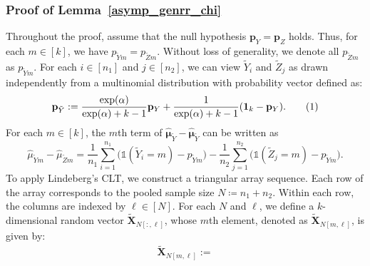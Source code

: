\documentclass[twoside,11pt]{article}
\newcommand\numberthis{\addtocounter{equation}{1}\tag{\theequation}}
\newcommand{\rvTwo}{Y}
\newcommand{\rvThree}{Z}
\newcommand{\vectorize}[1]{\mathbf{#1}}
\newcommand{\rvX}{X} %
\newcommand{\rVecX}{\vectorize{\rvX}}
\newcommand{\rvY}{Y}
\newcommand{\rvZ}{Z}
\newcommand{\sampleIndexOne}{i}
\newcommand{\sampleIndexTwo}{j}
\newcommand{\alphabetSize}{k} %
\newcommand{\vectorIndex}{m}
\newcommand{\sampleSize}{n}
\newcommand{\probVecElement}[2]{p_{{#1}{#2}}}
\newcommand{\probVec}{\mathbf{p}} %
\begin{document}
\begin{appendix}
	\subsubsection{Proof of Lemma~\ref{asymp_genrr_chi}}\label{proof:asymp_genrr_chi}
	Throughout the proof, assume that the null hypothesis $\probVec_{\rvTwo} = \probVec_{\rvZ}$ holds. Thus, for each $\vectorIndex \in [\alphabetSize]$, we have $\probVecElement{\tilde{\rvTwo}}{\vectorIndex} = \probVecElement{\tilde{\rvThree}}{\vectorIndex}$. Without loss of generality, we  denote all $\probVecElement{\tilde{\rvThree}}{\vectorIndex}$ as $\probVecElement{\tilde{\rvTwo}}{\vectorIndex}$.
	For each
	$\sampleIndexOne \in [\sampleSize_1]$
	and
	$\sampleIndexTwo \in [\sampleSize_2]$,
	we can  view $\tilde{\rvY}_{\sampleIndexOne}$ and $\tilde{\rvZ}_{\sampleIndexTwo}$ as  drawn independently from a multinomial distribution with probability vector defined as:
	\begin{align*}
		\probVec_{\tilde{\rvTwo}}
		:=
		\frac
		{\exp(\alpha)}
		{\exp(\alpha) + \alphabetSize - 1 }\probVec_{\rvTwo}
		+
		\frac
		{1}
		{\exp(\alpha) + \alphabetSize - 1 }(\mathbf{1}_\alphabetSize-\probVec_{\rvTwo})	.
		\numberthis \label{genrr_transformed_p}
	\end{align*}
	For each $m \in [\alphabetSize]$, the $\vectorIndex$th term of $
	\hat{\boldsymbol{\mu}}_{\tilde{\rvY}}
	-
	\hat{\boldsymbol{\mu}}_{\tilde{\rvY}}
	$ can be written as
	\begin{equation*}
		\hat{{\mu}}_{ \tilde{\rvY} \vectorIndex}
		-
		\hat{{\mu}}_{ \tilde{\rvZ} \vectorIndex}
		=
		\frac{1}{\sampleSize_1}
		\sum_{\sampleIndexOne=1}^{\sampleSize_1}
		\bigl(
		\mathds{1}(\tilde{\rvTwo}_\sampleIndexOne = \vectorIndex)
		-
		\probVecElement{\tilde{\rvTwo}}{\vectorIndex}
		\bigr)
		-
		\frac{1}{\sampleSize_2}
		\sum_{\sampleIndexTwo=1}^{\sampleSize_2}
		\bigl(
		\mathds{1}(\tilde{\rvThree}_\sampleIndexTwo = \vectorIndex)
		-
		\probVecElement{\tilde{\rvTwo}}{\vectorIndex}
		\bigr).
	\end{equation*}
	To apply Lindeberg's CLT, we construct a triangular array sequence. Each row of the array corresponds to the pooled sample size $N \coloneqq \sampleSize_1 + \sampleSize_2$. Within each row, the columns are indexed by $\ell \in [N]$. For each $N$ and $\ell$, we define a $\alphabetSize$-dimensional random vector $\tilde{\rVecX}_{N[:,\ell]}$, whose $\vectorIndex$th element, denoted as $\tilde{\rVecX}_{N[\vectorIndex,\ell]}$, is given by: 
	\begin{align*}
		\tilde{\rVecX}_{N[\vectorIndex,\ell]} :=

\end{align*}
\end{appendix}
\end{document}
